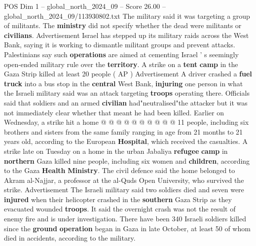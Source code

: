 \begin{textsample}{POS Dim 1 – global\_north\_2024\_09 – Score 26.00 – global\_north\_2024\_09/113930802.txt}
The military said it was targeting a group of militants.
The \textbf{ministry} did not specify whether the dead were militants or \textbf{civilians}.
Advertisement Israel has stepped up its military raids across the West Bank, saying it is working to dismantle militant groups and prevent attacks.
Palestinians say such \textbf{operations} are aimed at cementing Israel ' s seemingly open-ended military rule over the \textbf{territory}.
A strike on a \textbf{tent} \textbf{camp} in the Gaza Strip killed at least 20 people ( AP ) Advertisement A driver crashed a \textbf{fuel} \textbf{truck} into a bus stop in the \textbf{central} West Bank, \textbf{injuring} one person in what the Israeli military said was an attack targeting \textbf{troops} operating there.
Officials said that soldiers and an armed \textbf{civilian} had"neutralised"the attacker but it was not immediately clear whether that meant he had been killed.
Earlier on Wednesday, a strike hit a home @ @ @ @ @ @ @ @ @ @ 11 people, including six brothers and sisters from the same family ranging in age from 21 months to 21 years old, according to the European \textbf{Hospital}, which received the casualties.
A strike late on Tuesday on a home in the urban Jabaliya \textbf{refugee} \textbf{camp} in \textbf{northern} Gaza killed nine people, including six women and \textbf{children}, according to the Gaza \textbf{Health} \textbf{Ministry}.
The civil defence said the home belonged to Akram al-Najjar, a professor at the al-Quds Open University, who survived the strike.
Advertisement The Israeli military said two soldiers died and seven were \textbf{injured} when their helicopter crashed in the \textbf{southern} Gaza Strip as they evacuated wounded \textbf{troops}.
It said the overnight crash was not the result of enemy fire and is under investigation.
There have been 340 Israeli soldiers killed since the \textbf{ground} \textbf{operation} began in Gaza in late October, at least 50 of whom died in accidents, according to the military.

\end{textsample}
